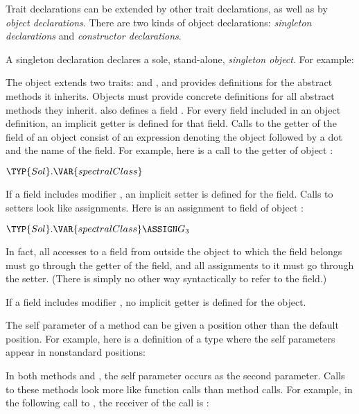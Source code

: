 Trait declarations can be extended by other trait declarations,
as well as by \emph{object declarations}.
There are two kinds of object declarations:
\emph{singleton declarations} and
\emph{constructor declarations}.

A singleton declaration declares a sole, stand-alone, \emph{singleton object}.
For example:


The object  extends two traits:  and ,
and provides definitions for the abstract methods it inherits. Objects must
provide concrete definitions for all abstract methods they inherit. 
also defines a field .
For every field included in an object
definition, an implicit getter is defined for that field. Calls to
the getter of the field of an object consist of an expression
denoting the object
followed by a dot and the name of the field. For example, here is a call to the
getter  of object :



\begin{Fortress}
\(\TYP{Sol}.\VAR{spectralClass}\)
\end{Fortress}

If a field includes modifier ,
an implicit setter is defined for the
field. Calls to setters look like assignments.
Here is an assignment to field 
of object :

\begin{Fortress}
\(\TYP{Sol}.\VAR{spectralClass} \ASSIGN G_{3}\)
\end{Fortress}

In fact,
all accesses to a field from outside the object to which the field belongs
must go through the getter of the field, and all assignments to it must go
through the setter. (There is simply no other way
syntactically to refer to the field.)

If a field includes modifier , no implicit getter is defined for the object.


The self parameter of a method can be given a position other than the default
position. For example, here is a definition of a type where the
self parameters appear in nonstandard positions:



In both methods  and , the self parameter occurs as the second parameter.
Calls to these methods look more like function calls than method calls. For example, in the following
call to , the receiver of the call is :


